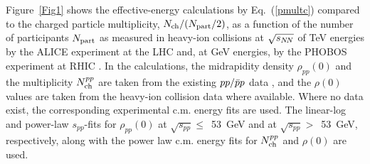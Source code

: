 \documentclass[twocolumn,showpacs,preprintnumbers,prd,superscriptaddress,nofootinbib]{revtex4}
\begin{document}
 Figure~\ref{Fig1} shows 
 the effective-energy calculations by Eq.~(\ref{pmultc}) 
 compared to 
 the charged particle multiplicity, $N_{\rm 
ch}/(N_{\rm part}/2)$,
  as a function of the number of participants $N_{\rm part}$
   as  measured in heavy-ion collisions at $\sqrt{s_{N\!N}}$ of TeV energies 
 by the ALICE  experiment at the LHC 
 and, at GeV energies, by the PHOBOS experiment at RHIC . 
 In the calculations, the midrapidity density $\rho_{pp}(0)$ and the 
multiplicity 
$N_{\rm{ch}}^{pp}$ are taken from the existing $pp/{\bar p}p$ data 
, and the $\rho(0)$ values are taken from the heavy-ion 
collision data  
 where 
 available. 
   Where no 
 data 
  exist, 
 the  corresponding experimental c.m. energy fits
 are  used.
 The 
 linear-log  
 and 
 power-law  
 $s_{pp}$-fits 
 for  
 $\rho_{pp}(0)$ at 
$\sqrt{s_{pp}}\leq$~53~GeV
 and 
at  
$\sqrt{s_{pp}}>$~53~GeV, 
respectively, along with 
 the 
 power law c.m. energy fits 
 for $N_{\rm{ch}}^{pp}$ 
 and 
  $\rho(0)$ 
  are used.
 
\end{document}
